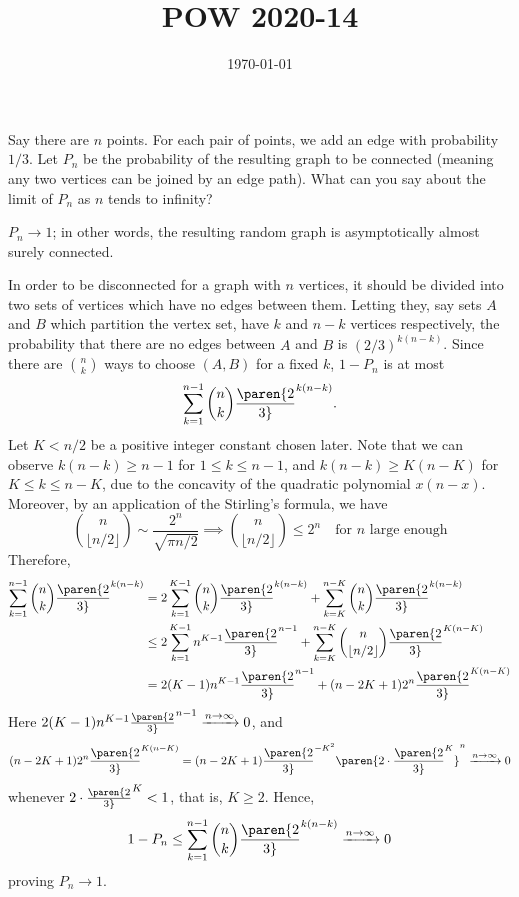 \documentclass{homework}
\title{POW 2020-14}
\date{\today}
\begin{document}
\maketitle

\noindent{}Say there are $n$ points. For each pair of points, we add an edge with probability $1/3$. Let $P_n$ be the probability of the resulting graph to be connected (meaning any two vertices can be joined by an edge path). What can you say about the limit of $P_n$ as $n$ tends to infinity?


\noindent{}\uline{$P_n\to 1$}; in other words, the resulting random graph is asymptotically almost surely connected.

In order to be disconnected for a graph with $n$ vertices, it should be divided into two sets of vertices which have no edges between them. Letting they, say sets $A$ and $B$ which partition the vertex set, have $k$ and $n-k$ vertices respectively, the probability that there are no edges between $A$ and $B$ is $(2/3)^{k (n-k)}$. Since there are $\binom n k$ ways to choose $(A,B)$ for a fixed $k$, $1 - P_n$ is at most
$$ \sum_{k=1}^{n-1} \binom n k \paren{2\over 3}^{k (n-k)}. $$
Let $K < n/2$ be a positive integer constant chosen later. Note that we can observe $k(n-k)\ge n-1$ for $1\le k\le n-1$, and $k(n-k)\ge K(n-K)$ for $K\le k\le n-K$, due to the concavity of the quadratic polynomial $x(n-x)$. Moreover, by an application of the Stirling's formula, we have
$$ \binom{n}{\lfloor n/2 \rfloor} \sim \frac{2^n}{\sqrt{\pi n / 2}} \implies \binom{n}{\lfloor n/2 \rfloor}\le 2^n\quad\text{for $n$ large enough} $$
Therefore,
\begin{align*}
  \sum_{k=1}^{n-1} \binom n k \paren{2\over 3}^{k (n-k)} &= 2\sum_{k=1}^{K-1} \binom n k \paren{2\over 3}^{k (n-k)} + \sum_{k=K}^{n-K} \binom n k \paren{2\over 3}^{k (n-k)}
  \\ &\le 2\sum_{k=1}^{K-1} n^{K-1} \paren{2\over 3}^{n-1} + \sum_{k=K}^{n-K} \binom n {\lfloor{n/2}\rfloor}\paren{2\over 3}^{K(n-K)}
  \\ &= 2(K-1)n^{K-1}\paren{2\over 3}^{n-1} + (n - 2K + 1) 2^n \paren{2\over 3}^{K(n-K)}
\end{align*}
Here $2(K-1)n^{K-1}\paren{2\over 3}^{n-1} \xrightarrow{n\to\infty} 0$, and 
$$ (n - 2K + 1) 2^n \paren{2\over 3}^{K(n-K)} = (n-2K+1) \paren{2\over 3}^{-K^2} \paren{2\cdot \paren{2\over 3}^K}^n \xrightarrow{n\to\infty} 0 $$
whenever $2\cdot \paren{2\over 3}^K < 1$, that is, $K\ge 2$.
Hence,
\begin{align*}
  1 - P_n \le \sum_{k=1}^{n-1} \binom n k \paren{2\over 3}^{k (n-k)} \xrightarrow{n\to\infty} 0 
\end{align*}
proving $P_n\to 1$.
\end{document}
